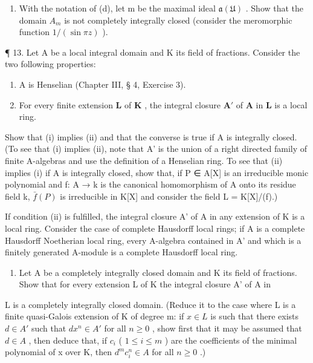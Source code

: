 \begin{enumerate}
\item
  With the notation of (d), let m be the maximal ideal \(\mathfrak{a}(\mathfrak{U})\) . Show that the domain \(A_{m}\) is not completely integrally closed (consider the meromorphic function \(1/(\sin\pi z)\) ).
\end{enumerate}

¶ 13. Let A be a local integral domain and K its field of fractions. Consider the two following properties:

\begin{enumerate}
\def\labelenumi{(\roman{enumi})}
\item
  A is Henselian (Chapter III, § 4, Exercise 3).
\item
  For every finite extension \(\mathbf{L}\) of \(\mathbf{K}\) , the integral closure \(\mathbf{A}'\) of \(\mathbf{A}\) in \(\mathbf{L}\) is a local ring.
\end{enumerate}

Show that (i) implies (ii) and that the converse is true if A is integrally closed. (To see that (i) implies (ii), note that A' is the union of a right directed family of finite A-algebras and use the definition of a Henselian ring. To see that (ii) implies (i) if A is integrally closed, show that, if P ∈ A{[}X{]} is an irreducible monic polynomial and f: A → k is the canonical homomorphism of A onto its residue field k, \(\bar{f}(P)\) is irreducible in K{[}X{]} and consider the field L = K{[}X{]}/(f).)

If condition (ii) is fulfilled, the integral closure A' of A in any extension of K is a local ring. Consider the case of complete Hausdorff local rings; if A is a complete Hausdorff Noetherian local ring, every A-algebra contained in A' and which is a finitely generated A-module is a complete Hausdorff local ring.

\begin{enumerate}
\def\labelenumi{\arabic{enumi}.}
\setcounter{enumi}{13}
\tightlist
\item
  Let A be a completely integrally closed domain and K its field of fractions. Show that for every extension L of K the integral closure A' of A in
\end{enumerate}

L is a completely integrally closed domain. (Reduce it to the case where L is a finite quasi-Galois extension of K of degree m: if \(x \in L\) is such that there exists \(d \in A'\) such that \(dx^{n} \in A'\) for all \(n \geqslant 0\) , show first that it may be assumed that \(d \in A\) , then deduce that, if \(c_{i}\) ( \(1 \leqslant i \leqslant m\) ) are the coefficients of the minimal polynomial of x over K, then \(d^{m}c_{i}^{n} \in A\) for all \(n \geqslant 0\) .)

